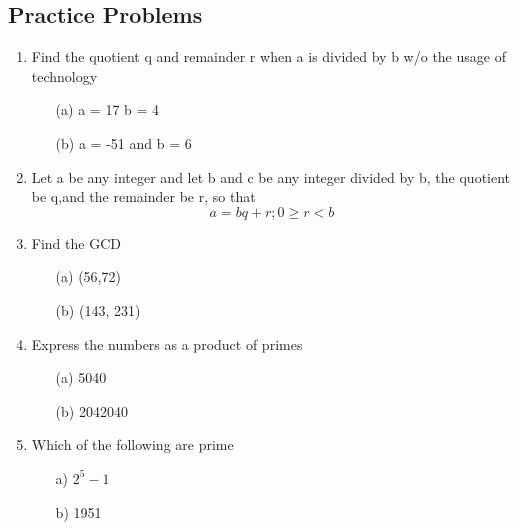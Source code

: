 \documentclass[12pt]{article}
\begin{document}
\subsection*{Practice Problems}
\begin{enumerate}
    \item Find the quotient q and remainder r when a is divided by b w/o the usage of technology
    \begin{itemize}
        \item[(a)] a = 17 b = 4
        \vspace{2cm}
        \item[(b)] a = -51 and b = 6
       \vspace{2cm}

    \end{itemize}
    \item Let a be any integer and let b and c be any integer divided by b, the quotient be q,and the remainder be r, so that
    \begin{equation*}
        a = bq + r;  0 \geq r < b
    \end{equation*}
   \clearpage
    \item Find the GCD
    \begin{itemize}
        \item[(a)] (56,72)
    \vspace{2cm}
        \item[(b)] (143, 231)
     \vspace{2cm}
    \end{itemize}
   \item Express the numbers as a product of primes
   \begin{itemize}
       \item[(a)] 5040
       \vspace{3cm}
       \item[(b)] 2042040
   \end{itemize}
   \item Which of the following are prime
   \begin{itemize}
       \item[a)] $2^{5} - 1$
        \vspace{3cm}
       \item[b)] 1951 

   \end{itemize}
\end{enumerate}
\end{document}
